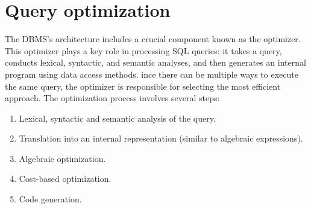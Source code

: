 \section{Query optimization}

The DBMS's architecture includes a crucial component known as the optimizer. 
This optimizer plays a key role in processing SQL queries: it takes a query, conducts lexical, syntactic, and semantic analyses, and then generates an internal program using data access methods.
ince there can be multiple ways to execute the same query, the optimizer is responsible for selecting the most efficient approach.
The optimization process involves several steps:
\begin{enumerate}
    \item Lexical, syntactic and semantic analysis of the query.
    \item Translation into an internal representation (similar to algebraic expressions). 
    \item Algebraic optimization.
    \item Cost-based optimization.
    \item Code generation.
\end{enumerate}

